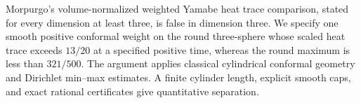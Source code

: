 Morpurgo's volume-normalized weighted Yamabe heat trace comparison,
stated for every dimension at least three, is false in dimension three.
We specify one smooth positive conformal weight on the round three-sphere
whose scaled heat trace exceeds \(13/20\) at a specified positive time,
whereas the round maximum is less than \(321/500\).
The argument applies classical cylindrical conformal geometry and
Dirichlet min--max estimates. A finite cylinder length, explicit smooth
caps, and exact rational certificates give quantitative separation.
